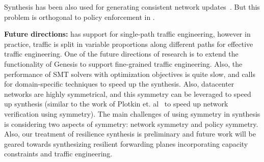 Synthesis has been also used for generating consistent network
updates~\cite{updates, customconsistency}. But this problem is orthogonal to 
policy enforcement in \Name.


\noindent
{\bf Future directions:}
\Name has support for single-path traffic engineering, however in
practice, traffic is split in variable proportions along different 
paths for effective traffic engineering. One of the future 
directions of research is to extend the functionality of Genesis
to support fine-grained traffic engineering. Also, the performance
of SMT solvers with optimization objectives is quite slow, and calls for 
domain-specific techniques to speed up the synthesis. Also, datacenter
networks are highly symmetrical, and this symmetry can be leveraged
to speed up synthesis (similar to the work of Plotkin et. al~\cite{symmetry} to
speed up network verification using symmetry). The main challenges of
using symmetry in synthesis is considering two aspects of symmetry: network
symmetry and policy symmetry. Also, our treatment of resilience synthesis
is preliminary and future work will be geared towards synthesizing resilient
forwarding planes incorporating capacity constraints and traffic engineering.
 
